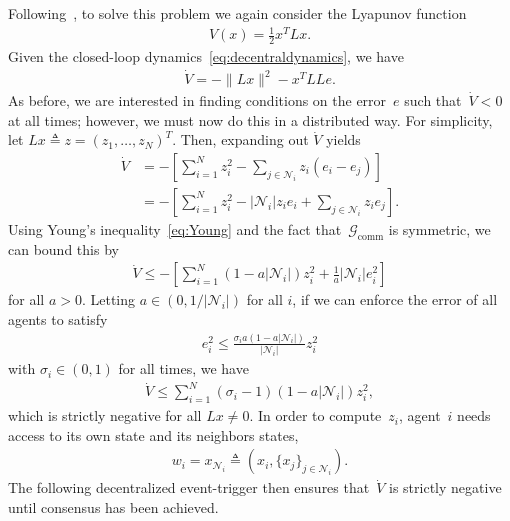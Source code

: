 \documentclass{autart}
\newcommand{\GG}{{\mathcal{G}}}
\newcommand{\NN}{{\mathcal{N}}}
\newcommand{\commgraph}{\GG_\text{comm}}
\newcommand{\TwoNorm}[1]{\|#1\|}
\begin{document}
Following~\cite{DVD-EF-KHJ:12}, to solve this problem we again
consider the Lyapunov function
\begin{align*}
  V(x) = \frac{1}{2}x^T L x.
\end{align*}
Given the closed-loop dynamics~\eqref{eq:decentraldynamics}, we have
\begin{align}\label{eq:lyapderivative2}
  \dot{V} = -\TwoNorm{Lx}^2 - x^T L L e .
\end{align}
As before, we are interested in finding conditions on the error~$e$
such that~$\dot{V} < 0$ at all times; however, we must now do this in
a distributed way. For simplicity, let
$Lx \triangleq z = (z_1, \dots, z_N)^T$. Then, expanding out $\dot{V}$
yields
\begin{align*}
  \dot{V} &= - \left[ \sum_{i=1}^N z_i^2 - \sum_{j \in \NN_i} z_i (e_i - e_j) \right] \\
  &= - \left[ \sum_{i=1}^N z_i^2 - | \NN_i | z_i e_i + \sum_{j \in \NN_i} z_i
  e_j \right]. 
\end{align*}
Using Young's inequality~\eqref{eq:Young} and the fact
that~$\commgraph$ is symmetric, we can bound this by
\begin{align}\label{eq:finalbound}
  \dot{V} \leq - \left[ \sum_{i=1}^N (1 - a|\NN_i|)z_i^2 + \frac{1}{a}
  |\NN_i| e_i^2 \right]
\end{align}
for all $a > 0$. Letting $a \in (0, 1/|\NN_i|)$ for all $i$, if we can
enforce the error of all agents to satisfy
\begin{align*}
  e_i^2 \leq \frac{ \sigma_i a (1 - a|\NN_i|)}{|\NN_i|} z_i^2
\end{align*}
with $\sigma_i \in (0,1)$ for all times, we have
\begin{align}\label{eq:finalderivative}
  \dot{V} \leq \sum_{i=1}^N (\sigma_i - 1)(1-a|\NN_i|)z_i^2,
\end{align}
which is strictly negative for all $Lx \neq 0$. 
{In order to compute~$z_i$, agent~$i$ needs access to its
own state and its neighbors states,
\begin{align*}
  w_i = x_{\NN_i} \triangleq (x_i, \{x_j \}_{j \in \NN_i}).
\end{align*}
}
The following decentralized event-trigger then ensures that~$\dot{V}$ is strictly negative
until consensus has been achieved.
\end{document}
